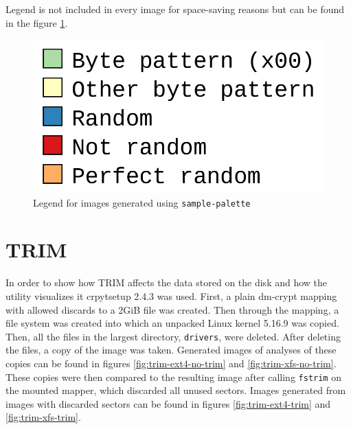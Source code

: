 \documentclass[
  digital, %
  color,   %
  oneside, %
  lof,     %
  nolot,     %
]{fithesis4}
\begin{document}


Legend is not included in every image for space-saving reasons but can be found in the figure \ref{fig:legend}.

\begin{figure}[H]
  \includegraphics[width=.45\textwidth,interpolate=true]{legend.png}
  \caption{Legend for images generated using \texttt{sample-palette}}
  \label{fig:legend}
\end{figure}

\section{TRIM}
\label{sec:trim}

In order to show how TRIM affects the data stored on the disk and how the utility visualizes it crpytsetup 2.4.3 was used. 
First, a plain dm-crypt mapping with allowed discards to a 2GiB file was created.
Then through the mapping, a file system was created into which an unpacked Linux kernel 5.16.9 was copied.
Then, all the files in the largest directory, \texttt{drivers}, were deleted.
After deleting the files, a copy of the image was taken.
Generated images of analyses of these copies can be found in figures \ref{fig:trim-ext4-no-trim} and \ref{fig:trim-xfs-no-trim}.
These copies were then compared to the resulting image after calling \texttt{fstrim} on the mounted mapper, which discarded all unused sectors.
Images generated from images with discarded sectors can be found in figures \ref{fig:trim-ext4-trim} and \ref{fig:trim-xfs-trim}.
\end{document}
